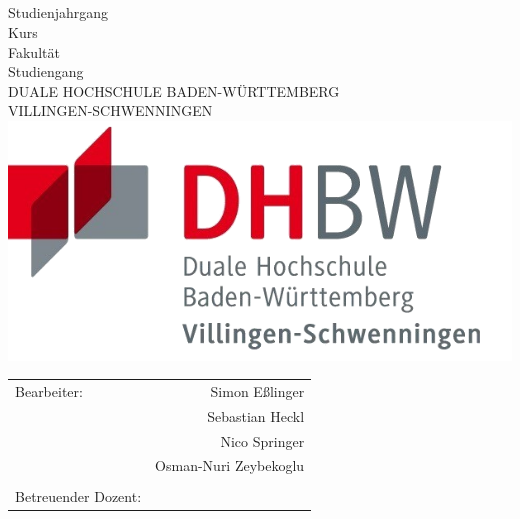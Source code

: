 
\thispagestyle{empty}

\begin{center}
\vspace*{1cm} \ \\
{\fontsize{40}{48}\selectfont \bfseries \mytitlewithlinebreaks \\}
\vspace{0.75cm}
{\Large\bfseries \mysubtitlewithlinebreaks \\}
\vspace{1.5cm}
\mytexttype \\
Studienjahrgang \myyearofstudy \\
Kurs \mycourse \\
\vspace{1.5cm}
Fakultät \myfaculty \\
Studiengang \mycourseofstudy \\
DUALE HOCHSCHULE BADEN-WÜRTTEMBERG\\
VILLINGEN-SCHWENNINGEN\\
\vspace{2.5cm}
\includegraphics[width=.45\linewidth]{../assets/dhbw-vs-logo}
\end{center}
\begin{table}[b]
\centering
\begin{tabular}{lr}
Bearbeiter: 		&	Simon Eßlinger \\
                    &	Sebastian Heckl \\
                    &	Nico Springer \\
                    &	Osman-Nuri Zeybekoglu \\
                    & \\
Betreuender Dozent:	&	\mylecturer \\
\end{tabular}\\
\end{table}
